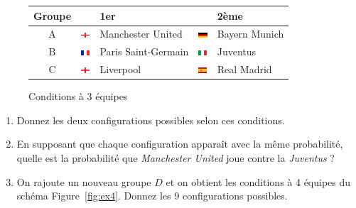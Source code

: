 \documentclass{../ficheTDTP}
\begin{document}
\begin{enumerate}
\begin{figure}[ht]
\begin{tabular}{|c|ll|ll|}
\hline
Groupe & & 1er & & 2ème \\ \hline
A & \includegraphics[height=0.2cm]{flags/en.png} & Manchester United & \includegraphics[height=0.2cm]{flags/de.png} & Bayern Munich \\ \hline
B & \includegraphics[height=0.2cm]{flags/fr.png} & Paris Saint-Germain & \includegraphics[height=0.2cm]{flags/it.png} & Juventus \\ \hline
C & \includegraphics[height=0.2cm]{flags/en.png} & Liverpool & \includegraphics[height=0.2cm]{flags/es.png} & Real Madrid \\ \hline
\end{tabular}

\caption{Conditions à 3 équipes}
\label{fig:ex3}
\end{figure}

\begin{enumerate}
\item Donnez les deux configurations possibles selon ces conditions.

\item En supposant que chaque configuration apparaît avec la même probabilité, quelle est la probabilité que \textit{Manchester United} joue contre la \textit{Juventus} ?

\item On rajoute un nouveau groupe $D$ et on obtient les conditions à 4 équipes du schéma Figure~\ref{fig:ex4}. Donnez les 9 configurations possibles.


\end{enumerate}
\end{enumerate}
\end{document}
